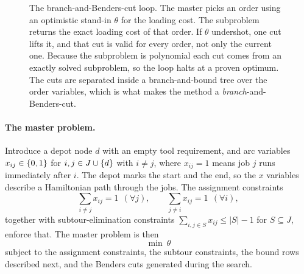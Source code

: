 \begin{figure}[t]\centering
{}
\caption{The branch-and-Benders-cut loop. The master picks an order using an
optimistic stand-in $\theta$ for the loading cost. The subproblem returns the exact
loading cost of that order. If $\theta$ undershot, one cut lifts it, and that cut is
valid for every order, not only the current one. Because the subproblem is polynomial
each cut comes from an exactly solved subproblem, so the loop halts at a proven optimum. The cuts are separated
inside a branch-and-bound tree over the order variables, which is what makes the
method a \emph{branch}-and-Benders-cut.}
\label{fig:benders}
\end{figure}

\paragraph{The master problem.}
Introduce a depot node $d$ with an empty tool requirement, and arc variables
$x_{ij}\in\{0,1\}$ for $i,j\in J\cup\{d\}$ with $i\ne j$, where $x_{ij}=1$ means
job $j$ runs immediately after $i$. The depot marks the start and the end, so the
$x$ variables describe a Hamiltonian path through the jobs. The assignment
constraints
\[
  \sum_{i\ne j}x_{ij}=1\ \ (\forall j),\qquad \sum_{j\ne i}x_{ij}=1\ \ (\forall i),
\]
together with subtour-elimination constraints
$\sum_{i,j\in S}x_{ij}\le\lvert S\rvert-1$ for $S\subseteq J$, enforce that. The
master problem is then
\[
  \min\ \theta
\]
subject to the assignment constraints, the subtour constraints, the bound rows
described next, and the Benders cuts generated during the search.

